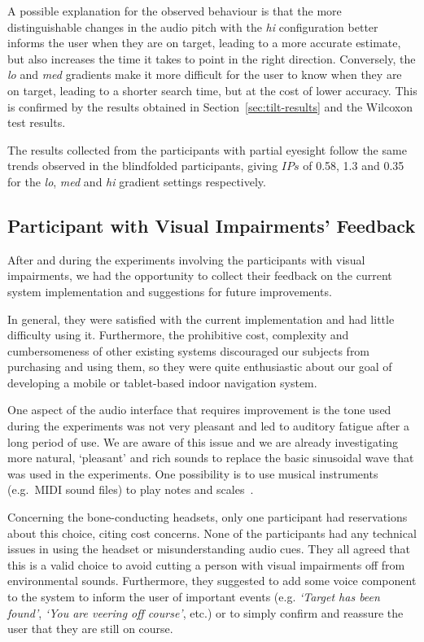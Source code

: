 \documentclass[sigconf, review=true, screen=true, anonymous=true]{acmart}
\begin{document}
A possible explanation for the observed behaviour is that the more distinguishable changes in the audio pitch with the \emph{hi} configuration better informs the user when they are on target, leading to a more accurate estimate, but also increases the time it takes to point in the right direction.
Conversely, the \emph{lo} and \emph{med} gradients make it more difficult for the user to know when they are on target, leading to a shorter search time, but at the cost of lower accuracy.
This is confirmed by the results obtained in Section~\ref{sec:tilt-results} and the Wilcoxon test results. 

The results collected from the participants with partial eyesight follow the same trends observed in the blindfolded participants, giving $IPs$ of 0.58, 1.3 and 0.35 for the \emph{lo}, \emph{med} and \emph{hi} gradient settings respectively.  

\subsection{Participant with Visual Impairments' Feedback}

After and during the experiments involving the participants with visual impairments, we had the opportunity to collect their feedback on the current system implementation and suggestions for future improvements.

In general, they were satisfied with the current implementation and had little difficulty using it.
Furthermore, the prohibitive cost, complexity and cumbersomeness of other existing systems discouraged our subjects from purchasing and using them, so they were quite enthusiastic about our goal of developing a mobile or tablet-based indoor navigation system. 

One aspect of the audio interface that requires improvement is the tone used during the experiments was not very pleasant and led to auditory fatigue after a long period of use.
We are aware of this issue and we are already investigating more natural, `pleasant' and rich sounds to replace the basic sinusoidal wave that was used in the experiments.
One possibility is to use musical instruments (e.g.\ MIDI sound files) to play notes and scales~\cite{brewster1998using}.

Concerning the bone-conducting headsets, only one participant had reservations about this choice, citing cost concerns.
None of the participants had any technical issues in using the headset or misunderstanding audio cues.
They all agreed that this is a valid choice to avoid cutting a person with visual impairments off from environmental sounds.
Furthermore, they suggested to add some voice component to the system to inform the user of important events (e.g. \emph{`Target has been found'}, \emph{`You are veering off course'}, etc.) or to simply confirm and reassure the user that they are still on course.
\end{document}
